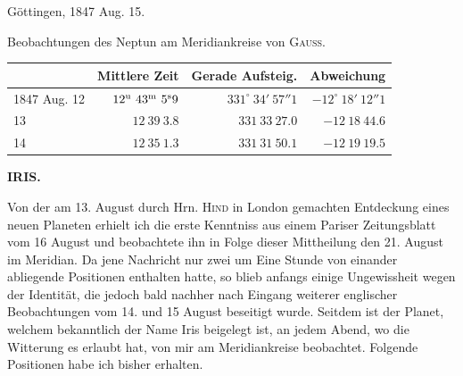 \par{}\bigskip
\hypertarget{native-477-lower}{}
\begin{flushright}Göttingen, 1847 Aug. 15.\end{flushright}

\begin{center}Beobachtungen des Neptun am Meridiankreise von \textsc{Gauss}.\end{center}

\begin{center}
\setlength{\tabcolsep}{3pt}
\begin{tabular}{l|r|r|r}
 & Mittlere Zeit & Gerade Aufsteig. & Abweichung \\\hline
1847 Aug. 12 & $12^{\rm u}\ 43^{\rm m}\ 5^{\rm s}9$ & $331^\circ\ 34'\ 57''1$ & $-12^\circ\ 18'\ 12''1$ \\
\hfill 13 & $12\ 39\ 3.8$ & $331\ 33\ 27.0$ & $-12\ 18\ 44.6$ \\
\hfill 14 & $12\ 35\ 1.3$ & $331\ 31\ 50.1$ & $-12\ 19\ 19.5$ \\
\end{tabular}
\end{center}

\clearpage
\noindent{}%
\makebox[12mm][l]{}%
\parbox[t]{\dimexpr\linewidth-24mm\relax}{\centering\footnotesize\bfseries IRIS.\par}%
\par\nobreak\medskip
{}

Von der am 13. August durch Hrn. \textsc{Hind} in London gemachten Entdeckung eines neuen Planeten erhielt ich die erste Kenntniss aus einem Pariser Zeitungsblatt vom 16 August und beobachtete ihn in Folge dieser Mittheilung den 21. August im Meridian. Da jene Nachricht nur zwei um Eine Stunde von einander abliegende Positionen enthalten hatte, so blieb anfangs einige Ungewissheit wegen der Identität, die jedoch bald nachher nach Eingang weiterer englischer Beobachtungen vom 14. und 15 August beseitigt wurde. Seitdem ist der Planet, welchem bekanntlich der Name Iris beigelegt ist, an jedem Abend, wo die Witterung es erlaubt hat, von mir am Meridiankreise beobachtet. Folgende Positionen habe ich bisher erhalten.

